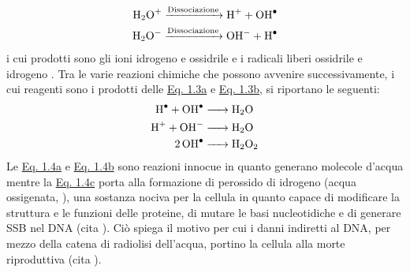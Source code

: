 \documentclass[12pt,a4paper,twoside]{report}
\begin{document}
	\begin{subequations}
		\begin{align}
			\label{eq:dissociazione1}
			\ce{H2O^{+} ->[Dissociazione] H^{+} + OH^{.}}\\
			\label{eq:dissociazione2}
			\ce{H2O^{-} ->[Dissociazione] OH^{-} + H^{.}}
		\end{align}
	\end{subequations}
	i cui prodotti sono gli ioni idrogeno  e ossidrile  e i radicali liberi ossidrile  e idrogeno . Tra le varie reazioni chimiche che possono avvenire successivamente, i cui reagenti sono i prodotti delle \hyperref[eq:dissociazione1]{Eq. 1.3a} e \hyperref[eq:dissociazione2]{Eq. 1.3b}, si riportano le seguenti:
	\begin{subequations}
		\begin{align}
			\label{eq:prodotto1}
			\ce{H^{.} + OH^{.} &-> H2O}\\
			\label{eq:prodotto2}
			\ce{H^{+} + OH^{-} &-> H2O}\\
			\label{eq:prodotto3}
			\ce{2OH^{.} &-> H2O2}
		\end{align}
	\end{subequations}
	Le \hyperref[eq:prodotto1]{Eq. 1.4a} e \hyperref[eq:prodotto2]{Eq. 1.4b} sono reazioni innocue in quanto generano molecole d'acqua mentre la \hyperref[eq:prodotto3]{Eq. 1.4c} porta alla formazione di perossido di idrogeno (acqua ossigenata, ), una sostanza nociva per la cellula in quanto capace di modificare la struttura e le funzioni delle proteine, di mutare le basi nucleotidiche e di generare SSB nel DNA (cita
	). Ciò spiega il motivo per cui i danni indiretti al DNA, per mezzo della catena di radiolisi dell'acqua, portino la cellula alla morte riproduttiva (cita
	).
	
\end{document}
